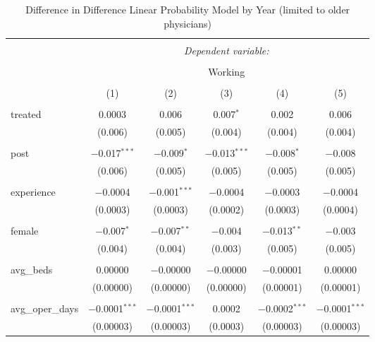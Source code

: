
\begin{table}[!htbp] \centering 
  \caption{Difference in Difference Linear Probability Model by Year (limited to older physicians)} 
  \label{} 
\scriptsize 
\begin{tabular}{@{\extracolsep{0pt}}lccccc} 
\\[-1.8ex]\hline 
\hline \\[-1.8ex] 
 & \multicolumn{5}{c}{\textit{Dependent variable:}} \\ 
\cline{2-6} 
\\[-1.8ex] & \multicolumn{5}{c}{Working} \\ 
\\[-1.8ex] & (1) & (2) & (3) & (4) & (5)\\ 
\hline \\[-1.8ex] 
 treated & 0.0003 & 0.006 & 0.007$^{*}$ & 0.002 & 0.006 \\ 
  & (0.006) & (0.005) & (0.004) & (0.004) & (0.004) \\ 
  & & & & & \\ 
 post & $-$0.017$^{***}$ & $-$0.009$^{*}$ & $-$0.013$^{***}$ & $-$0.008$^{*}$ & $-$0.008 \\ 
  & (0.006) & (0.005) & (0.005) & (0.005) & (0.005) \\ 
  & & & & & \\ 
 experience & $-$0.0004 & $-$0.001$^{***}$ & $-$0.0004 & $-$0.0003 & $-$0.0004 \\ 
  & (0.0003) & (0.0003) & (0.0002) & (0.0003) & (0.0004) \\ 
  & & & & & \\ 
 female & $-$0.007$^{*}$ & $-$0.007$^{**}$ & $-$0.004 & $-$0.013$^{**}$ & $-$0.003 \\ 
  & (0.004) & (0.004) & (0.003) & (0.005) & (0.005) \\ 
  & & & & & \\ 
 avg\_beds & 0.00000 & $-$0.00000 & $-$0.00000 & $-$0.00001 & 0.00000 \\ 
  & (0.00000) & (0.00000) & (0.00000) & (0.00001) & (0.00001) \\ 
  & & & & & \\ 
 avg\_oper\_days & $-$0.0001$^{***}$ & $-$0.0001$^{***}$ & 0.0002 & $-$0.0002$^{***}$ & $-$0.0001$^{***}$ \\ 
  & (0.00003) & (0.00003) & (0.0003) & (0.00003) & (0.00003) \\ 

\end{tabular}
\end{table}
